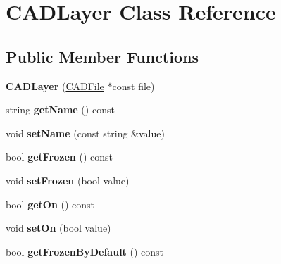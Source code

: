 \hypertarget{class_c_a_d_layer}{}\section{C\+A\+D\+Layer Class Reference}
\label{class_c_a_d_layer}
\subsection*{Public Member Functions}
\begin{DoxyCompactItemize}
\item 
{\bfseries C\+A\+D\+Layer} (\hyperlink{class_c_a_d_file}{C\+A\+D\+File} $\ast$const file)\hypertarget{class_c_a_d_layer_aa6d8888ff1c36c9eb81000448e829e9c}{}\label{class_c_a_d_layer_aa6d8888ff1c36c9eb81000448e829e9c}

\item 
string {\bfseries get\+Name} () const \hypertarget{class_c_a_d_layer_aaf7093bc3420a5b32fba2952d71a560b}{}\label{class_c_a_d_layer_aaf7093bc3420a5b32fba2952d71a560b}

\item 
void {\bfseries set\+Name} (const string \&value)\hypertarget{class_c_a_d_layer_a604998bc6878ec32f512b2231b8c59ff}{}\label{class_c_a_d_layer_a604998bc6878ec32f512b2231b8c59ff}

\item 
bool {\bfseries get\+Frozen} () const \hypertarget{class_c_a_d_layer_accd955ff448032d00f5e7eeacf29ecbd}{}\label{class_c_a_d_layer_accd955ff448032d00f5e7eeacf29ecbd}

\item 
void {\bfseries set\+Frozen} (bool value)\hypertarget{class_c_a_d_layer_aa3fd384bd46ff0ae99758c28d18a0404}{}\label{class_c_a_d_layer_aa3fd384bd46ff0ae99758c28d18a0404}

\item 
bool {\bfseries get\+On} () const \hypertarget{class_c_a_d_layer_a62609972d7388381e0a7ef7a16e6e462}{}\label{class_c_a_d_layer_a62609972d7388381e0a7ef7a16e6e462}

\item 
void {\bfseries set\+On} (bool value)\hypertarget{class_c_a_d_layer_a62238a4b8ee55db8d2433676ba7e8d72}{}\label{class_c_a_d_layer_a62238a4b8ee55db8d2433676ba7e8d72}

\item 
bool {\bfseries get\+Frozen\+By\+Default} () const \hypertarget{class_c_a_d_layer_ad9a5b8eedf99a44eea36d73f88dc4270}{}\label{class_c_a_d_layer_ad9a5b8eedf99a44eea36d73f88dc4270}


\end{DoxyCompactItemize}
